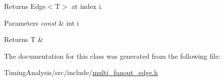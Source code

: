 Returns Edge$<$\-T$>$ at index i. 


\begin{DoxyParams}{Parameters}
{\em const} & int i\\
\hline
\end{DoxyParams}
\begin{DoxyReturn}{Returns}
T \& 
\end{DoxyReturn}


The documentation for this class was generated from the following file\-:\begin{DoxyCompactItemize}
\item 
Timing\-Analysis/src/include/\hyperlink{multi__fanout__edge_8h}{multi\-\_\-fanout\-\_\-edge.\-h}\end{DoxyCompactItemize}
